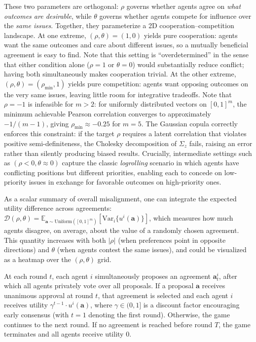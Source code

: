 These two parameters are orthogonal: $\rho$ governs whether agents agree on \emph{what outcomes are desirable}, while $\theta$ governs whether agents compete for influence over the \emph{same issues}.
Together, they parameterize a 2D cooperation--competition landscape.
At one extreme, $(\rho, \theta) = (1, 0)$ yields pure cooperation: agents want the same outcomes and care about different issues, so a mutually beneficial agreement is easy to find.
Note that this setting is ``overdetermined'' in the sense that either condition alone ($\rho = 1$ or $\theta = 0$) would substantially reduce conflict; having both simultaneously makes cooperation trivial.
At the other extreme, $(\rho, \theta) = (\rho_{\min}, 1)$ yields pure competition: agents want opposing outcomes on the very same issues, leaving little room for integrative tradeoffs.
Note that $\rho = -1$ is infeasible for $m > 2$: for uniformly distributed vectors on $[0,1]^m$, the minimum achievable Pearson correlation converges to approximately $-1/(m-1)$, giving $\rho_{\min} \approx -0.25$ for $m = 5$.
The Gaussian copula correctly enforces this constraint: if the target $\rho$ requires a latent correlation that violates positive semi-definiteness, the Cholesky decomposition of $\Sigma_z$ fails, raising an error rather than silently producing biased results.
Crucially, intermediate settings such as $(\rho < 0, \theta \approx 0)$ capture the classic \emph{logrolling} scenario in which agents have conflicting positions but different priorities, enabling each to concede on low-priority issues in exchange for favorable outcomes on high-priority ones.

As a scalar summary of overall misalignment, one can integrate the expected utility difference across agreements:
$\mathcal{D}(\rho, \theta) = \mathbb{E}_{\bm{a} \sim \text{Uniform}([0,1]^m)} \left[\text{Var}_i\{u^i(\bm{a})\}\right]$,
which measures how much agents disagree, on average, about the value of a randomly chosen agreement.
This quantity increases with both $|\rho|$ (when preferences point in opposite directions) and $\theta$ (when agents contest the same issues), and could be visualized as a heatmap over the $(\rho, \theta)$ grid.

At each round $t$, each agent $i$ simultaneously proposes an agreement $\bm{a}^{i}_{t}$, after which all agents privately vote over all proposals.
If a proposal $\bm{a}$ receives unanimous approval at round $t$, that agreement is selected and each agent $i$ receives utility $\gamma^{t-1} \cdot u^i(\bm{a})$, where $\gamma \in (0,1]$ is a discount factor encouraging early consensus (with $t=1$ denoting the first round).
Otherwise, the game continues to the next round.
If no agreement is reached before round $T$, the game terminates and all agents receive utility 0.

